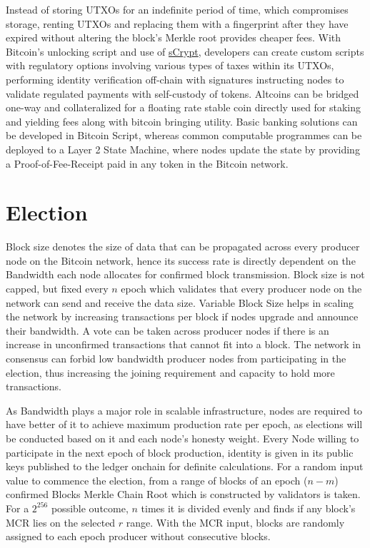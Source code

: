 \documentclass[a4paper,10pt]{article}
\begin{document}
Instead of storing UTXOs for an indefinite period of time, which compromises storage, renting UTXOs and replacing them with a fingerprint after they have expired without altering the block’s Merkle root provides cheaper fees. With Bitcoin’s unlocking script and use of \href{https://scrypt.io}{sCrypt}, developers can create custom scripts with regulatory options involving various types of taxes within its UTXOs, performing identity verification off-chain with signatures instructing nodes to validate regulated payments with self-custody of tokens. Altcoins can be bridged one-way and collateralized for a floating rate stable coin directly used for staking and yielding fees along with bitcoin bringing utility. Basic banking solutions can be developed in Bitcoin Script, whereas common computable programmes can be deployed to a Layer 2 State Machine, where nodes update the state by providing a Proof-of-Fee-Receipt paid in any token in the Bitcoin network. 
\section{Election}
Block size denotes the size of data that can be propagated across every producer node on the Bitcoin network, hence its success rate is directly dependent on the Bandwidth each node allocates for confirmed block transmission. Block size is not capped, but fixed every $n$ epoch which validates that every producer node on the network can send and receive the data size. Variable Block Size helps in scaling the network by increasing transactions per block if nodes upgrade and announce their bandwidth. A vote can be taken across producer nodes if there is an increase in unconfirmed transactions that cannot fit into a block. The network in consensus can forbid low bandwidth producer nodes from participating in the election, thus increasing the joining requirement and capacity to hold more transactions. 

As Bandwidth plays a major role in scalable infrastructure, nodes are required to have better of it to achieve maximum production rate per epoch, as elections will be conducted based on it and each node's honesty weight. Every Node willing to participate in the next epoch of block production, identity is given in its public keys published to the ledger onchain for definite calculations. For a random input value to commence the election, from a range of blocks of an epoch ($n-m$) confirmed Blocks Merkle Chain Root which is constructed by validators is taken. For a $2^{256}$ possible outcome, $n$ times it is divided evenly and finds if any block's MCR lies on the selected $r$ range. With the MCR input, blocks are randomly assigned to each epoch producer without consecutive blocks. 
\end{document}
